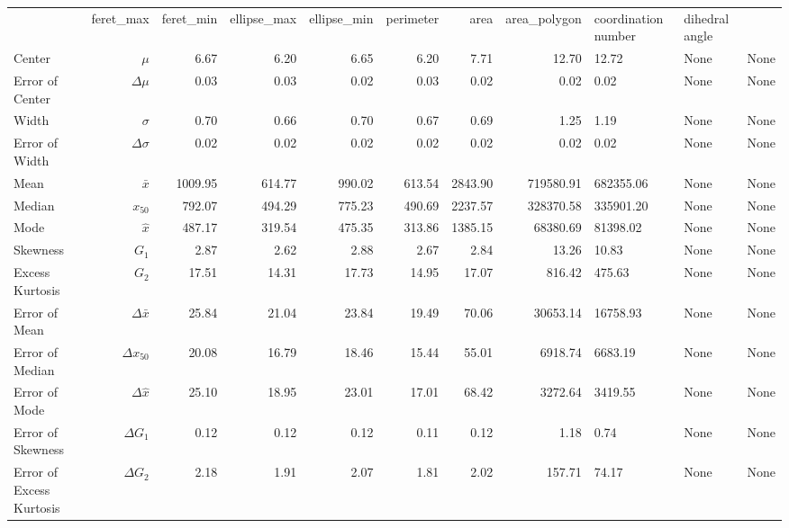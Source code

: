 \begin{tabular}{lrrrrrrrll}
 & feret_max & feret_min & ellipse_max & ellipse_min & perimeter & area & area_polygon & coordination number & dihedral angle \\
Center &$\mu$ & 6.67 & 6.20 & 6.65 & 6.20 & 7.71 & 12.70 & 12.72 & None & None \\
Error of Center &$\Delta\mu$ & 0.03 & 0.03 & 0.02 & 0.03 & 0.02 & 0.02 & 0.02 & None & None \\
Width &$\sigma$ & 0.70 & 0.66 & 0.70 & 0.67 & 0.69 & 1.25 & 1.19 & None & None \\
Error of Width &$\Delta\sigma$ & 0.02 & 0.02 & 0.02 & 0.02 & 0.02 & 0.02 & 0.02 & None & None \\
Mean &$\bar{x}$ & 1009.95 & 614.77 & 990.02 & 613.54 & 2843.90 & 719580.91 & 682355.06 & None & None \\
Median &$x_{50}$ & 792.07 & 494.29 & 775.23 & 490.69 & 2237.57 & 328370.58 & 335901.20 & None & None \\
Mode &$\hat{x}$ & 487.17 & 319.54 & 475.35 & 313.86 & 1385.15 & 68380.69 & 81398.02 & None & None \\
Skewness &$G_1$ & 2.87 & 2.62 & 2.88 & 2.67 & 2.84 & 13.26 & 10.83 & None & None \\
Excess Kurtosis &$G_2$ & 17.51 & 14.31 & 17.73 & 14.95 & 17.07 & 816.42 & 475.63 & None & None \\
Error of Mean &$\Delta\bar{x}$ & 25.84 & 21.04 & 23.84 & 19.49 & 70.06 & 30653.14 & 16758.93 & None & None \\
Error of Median &$\Delta x_{50}$ & 20.08 & 16.79 & 18.46 & 15.44 & 55.01 & 6918.74 & 6683.19 & None & None \\
Error of Mode &$\Delta \hat{x}$ & 25.10 & 18.95 & 23.01 & 17.01 & 68.42 & 3272.64 & 3419.55 & None & None \\
Error of Skewness &$\Delta G_1$ & 0.12 & 0.12 & 0.12 & 0.11 & 0.12 & 1.18 & 0.74 & None & None \\
Error of Excess Kurtosis &$\Delta G_2$ & 2.18 & 1.91 & 2.07 & 1.81 & 2.02 & 157.71 & 74.17 & None & None \\
\end{tabular}
